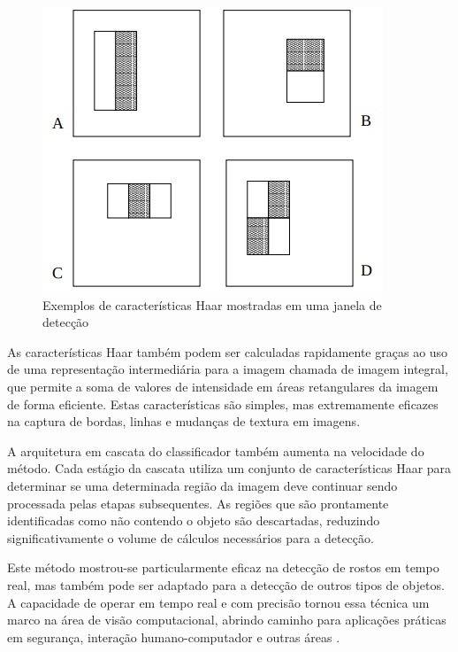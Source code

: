 \documentclass[12pt, %
openright, 
oneside, %
a4paper,    %
brazil]{facom-ufu-abntex2}
\begin{document}
\begin{figure}[!ht]
	\centering
	\includegraphics[width=0.7\linewidth]{haar_features.jpeg}
	\caption[Exemplos de características Haar mostradas em uma janela de
		detecção]{Exemplos de características Haar mostradas em uma janela de detecção}
	\label{fig:haar}
\end{figure}

As características Haar também podem ser calculadas rapidamente graças ao uso
de uma representação intermediária para a imagem chamada de imagem integral,
que permite a soma de valores de intensidade em áreas retangulares da imagem de
forma eficiente. Estas características são simples, mas extremamente eficazes
na captura de bordas, linhas e mudanças de textura em imagens.

A arquitetura em cascata do classificador também aumenta na velocidade do
método. Cada estágio da cascata utiliza um conjunto de características Haar
para determinar se uma determinada região da imagem deve continuar sendo
processada pelas etapas subsequentes. As regiões que são prontamente
identificadas como não contendo o objeto são descartadas, reduzindo
significativamente o volume de cálculos necessários para a detecção.

Este método mostrou-se particularmente eficaz na detecção de rostos em tempo
real, mas também pode ser adaptado para a detecção de outros tipos de objetos.
A capacidade de operar em tempo real e com precisão tornou essa técnica um
marco na área de visão computacional, abrindo caminho para aplicações práticas
em segurança, interação humano-computador e outras áreas \cite{990517}.
\end{document}
